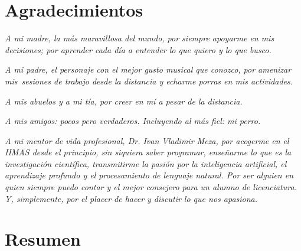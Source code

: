 \documentclass[letter]{book}
\newcommand{\twelveptsize}{%
  \fontsize{12}{15}\selectfont}
\begin{document}
\tableofcontents

\mainmatter

\twelveptsize

\chapter*{Agradecimientos}

\noindent
\emph{
  A mi madre, la más maravillosa del mundo, por siempre apoyarme en mis decisiones;
  por aprender cada día a entender lo que quiero y lo que busco.
}\par
\vspace{8mm}
\noindent
\emph{
  A mi padre, el personaje con el mejor gusto musical que conozco, por amenizar mis\
  sesiones de trabajo desde la distancia y echarme porras en mis actividades.
}\par
\vspace{8mm}
\noindent
\emph{
  A mis abuelos y a mi tía, por creer en mí a pesar de la distancia.
}\par
\vspace{8mm}
\noindent
\emph{
  A mis amigos: pocos pero verdaderos. Incluyendo al más fiel: mi perro.
}\par
\vspace{8mm}
\noindent
\emph{
  A mi mentor de vida profesional, Dr. Ivan Vladimir Meza, por acogerme en el IIMAS
  desde el principio, sin siquiera saber programar, enseñarme lo que es la investigación
  científica, transmitirme la pasión por la inteligencia artificial, el aprendizaje profundo
  y el procesamiento de lenguaje natural. Por ser alguien en quien siempre puedo contar
  y el mejor consejero para un alumno de licenciatura.
  Y, simplemente, por el placer de hacer y discutir lo que nos apasiona.
}

\chapter*{Resumen}
\end{document}
